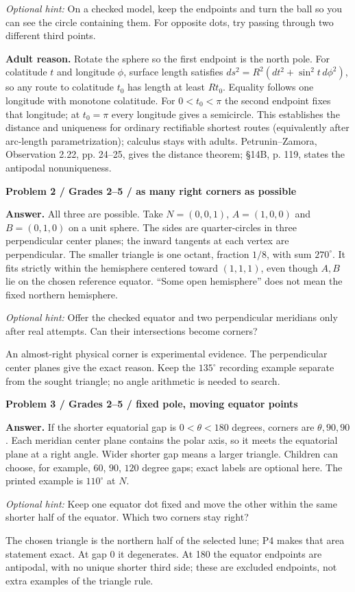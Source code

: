 \documentclass[11pt,letterpaper]{article}
\newcommand{\sub}[1]{\par\textbf{#1}\par}
\newcommand{\hint}[1]{\textit{Optional hint:} #1\par}
\newcommand{\degc}{^\circ}
\begin{document}
\hint{On a checked model, keep the endpoints and turn the ball so you can see the circle containing them. For opposite dots, try passing through two different third points.}
\textbf{Adult reason.} Rotate the sphere so the first endpoint is the north pole. For colatitude $t$ and longitude $\phi$, surface length satisfies $ds^2=R^2(dt^2+\sin^2t\,d\phi^2)$, so any route to colatitude $t_0$ has length at least $Rt_0$. Equality follows one longitude with monotone colatitude. For $0<t_0<\pi$ the second endpoint fixes that longitude; at $t_0=\pi$ every longitude gives a semicircle. This establishes the distance and uniqueness for ordinary rectifiable shortest routes (equivalently after arc-length parametrization); calculus stays with adults. Petrunin--Zamora, Observation 2.22, pp. 24--25, gives the distance theorem; \S14B, p. 119, states the antipodal nonuniqueness.

\sub{Problem 2 / Grades 2--5 / as many right corners as possible}
\textbf{Answer.} All three are possible. Take $N=(0,0,1)$, $A=(1,0,0)$ and $B=(0,1,0)$ on a unit sphere. The sides are quarter-circles in three perpendicular center planes; the inward tangents at each vertex are perpendicular. The smaller triangle is one octant, fraction $1/8$, with sum $270\degc$. It fits strictly within the hemisphere centered toward $(1,1,1)$, even though $A,B$ lie on the chosen reference equator. ``Some open hemisphere'' does not mean the fixed northern hemisphere.

\hint{Offer the checked equator and two perpendicular meridians only after real attempts. Can their intersections become corners?}
An almost-right physical corner is experimental evidence. The perpendicular center planes give the exact reason. Keep the $135\degc$ recording example separate from the sought triangle; no angle arithmetic is needed to search.

\sub{Problem 3 / Grades 2--5 / fixed pole, moving equator points}
\textbf{Answer.} If the shorter equatorial gap is $0<\theta<180$ degrees, corners are $\theta,90,90$. Each meridian center plane contains the polar axis, so it meets the equatorial plane at a right angle. Wider shorter gap means a larger triangle. Children can choose, for example, $60$, $90$, $120$ degree gaps; exact labels are optional here. The printed example is $110\degc$ at $N$.

\hint{Keep one equator dot fixed and move the other within the same shorter half of the equator. Which two corners stay right?}
The chosen triangle is the northern half of the selected lune; P4 makes that area statement exact. At gap 0 it degenerates. At 180 the equator endpoints are antipodal, with no unique shorter third side; these are excluded endpoints, not extra examples of the triangle rule.
\end{document}
